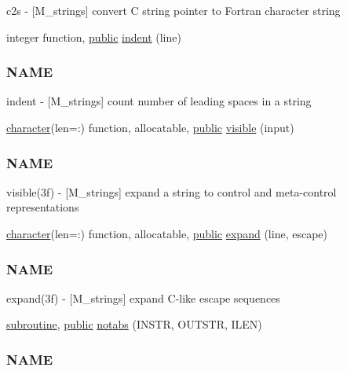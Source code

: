 \begin{DoxyCompactItemize}
\begin{DoxyCompactList}
c2s -\/ \mbox{[}M\+\_\+strings\mbox{]} convert C string pointer to Fortran character string \end{DoxyCompactList}\item 
integer function, \hyperlink{M__stopwatch_83_8txt_a2f74811300c361e53b430611a7d1769f}{public} \hyperlink{namespacem__strings_a020dcca7f01d33eedf28b17518a22b69}{indent} (line)
\begin{DoxyCompactList}\small\item\em \subsubsection*{N\+A\+ME}

indent -\/ \mbox{[}M\+\_\+strings\mbox{]} count number of leading spaces in a string \end{DoxyCompactList}\item 
\hyperlink{option__stopwatch_83_8txt_abd4b21fbbd175834027b5224bfe97e66}{character}(len=\+:) function, allocatable, \hyperlink{M__stopwatch_83_8txt_a2f74811300c361e53b430611a7d1769f}{public} \hyperlink{namespacem__strings_a791e24ceb690010fd42a6c1f48311b55}{visible} (input)
\begin{DoxyCompactList}\small\item\em \subsubsection*{N\+A\+ME}

visible(3f) -\/ \mbox{[}M\+\_\+strings\mbox{]} expand a string to control and meta-\/control representations \end{DoxyCompactList}\item 
\hyperlink{option__stopwatch_83_8txt_abd4b21fbbd175834027b5224bfe97e66}{character}(len=\+:) function, allocatable, \hyperlink{M__stopwatch_83_8txt_a2f74811300c361e53b430611a7d1769f}{public} \hyperlink{namespacem__strings_a33b248107c1521272b55cda5c4077378}{expand} (line, escape)
\begin{DoxyCompactList}\small\item\em \subsubsection*{N\+A\+ME}

expand(3f) -\/ \mbox{[}M\+\_\+strings\mbox{]} expand C-\/like escape sequences \end{DoxyCompactList}\item 
\hyperlink{M__stopwatch_83_8txt_acfbcff50169d691ff02d4a123ed70482}{subroutine}, \hyperlink{M__stopwatch_83_8txt_a2f74811300c361e53b430611a7d1769f}{public} \hyperlink{namespacem__strings_a3bf44ac06a670f55830e17a6f1108b9c}{notabs} (I\+N\+S\+TR, O\+U\+T\+S\+TR, I\+L\+EN)
\begin{DoxyCompactList}\small\item\em \subsubsection*{N\+A\+ME}


\end{DoxyCompactList}
\end{DoxyCompactItemize}
